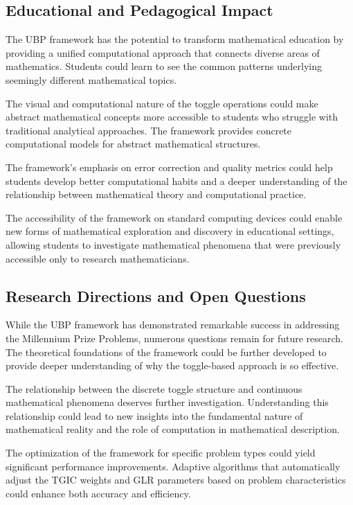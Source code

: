 \documentclass[11pt]{amsart}
\begin{document}
\subsection{Educational and Pedagogical Impact}

The UBP framework has the potential to transform mathematical education by providing a unified computational approach that connects diverse areas of mathematics. Students could learn to see the common patterns underlying seemingly different mathematical topics.

The visual and computational nature of the toggle operations could make abstract mathematical concepts more accessible to students who struggle with traditional analytical approaches. The framework provides concrete computational models for abstract mathematical structures.

The framework's emphasis on error correction and quality metrics could help students develop better computational habits and a deeper understanding of the relationship between mathematical theory and computational practice.

The accessibility of the framework on standard computing devices could enable new forms of mathematical exploration and discovery in educational settings, allowing students to investigate mathematical phenomena that were previously accessible only to research mathematicians.

\subsection{Research Directions and Open Questions}

While the UBP framework has demonstrated remarkable success in addressing the Millennium Prize Problems, numerous questions remain for future research. The theoretical foundations of the framework could be further developed to provide deeper understanding of why the toggle-based approach is so effective.

The relationship between the discrete toggle structure and continuous mathematical phenomena deserves further investigation. Understanding this relationship could lead to new insights into the fundamental nature of mathematical reality and the role of computation in mathematical description.

The optimization of the framework for specific problem types could yield significant performance improvements. Adaptive algorithms that automatically adjust the TGIC weights and GLR parameters based on problem characteristics could enhance both accuracy and efficiency.
\end{document}
